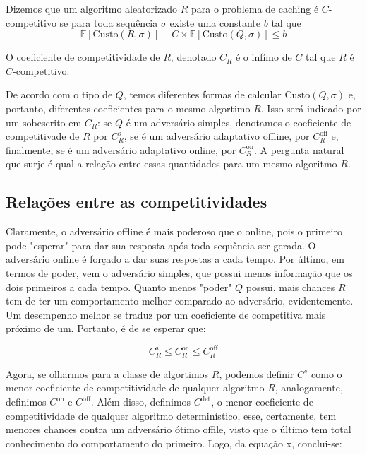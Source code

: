 \begin{definition}
  Dizemos que um algoritmo aleatorizado \(R\) para o problema de caching é \(C\)-competitivo se para toda sequência \(\sigma\) existe uma constante \(b\) tal que
  \begin{equation}
    \mathbb{E}[\text{Custo}(R, \sigma)] - C \times \mathbb{E}[\text{Custo}(Q, \sigma)] \leqslant b
  \end{equation}
  
\end{definition}

O coeficiente de competitividade de \(R\), denotado \(C_R\) é o infímo de \(C\) tal que \(R\) é \(C\)-competitivo.

De acordo com o tipo de \(Q\), temos diferentes formas de calcular \(\text{Custo}(Q, \sigma)\) e, portanto, diferentes coeficientes para o mesmo algortimo \(R\). Isso será indicado por um sobescrito em \(C_R\): se \(Q\) é um adversário simples, denotamos o coeficiente de competitivade de \(R\) por \(C_R^{\text{s}}\), se é um adversário adaptativo offline, por \(C_R^{\text{off}}\) e, finalmente, se é um adversário adaptativo online, por \(C_R^{\text{on}}\). A pergunta natural que surje é qual a relação entre essas quantidades para um mesmo algoritmo \(R\).

\subsection{Relações entre as competitividades}

Claramente, o adversário offline é mais poderoso que o online, pois o primeiro pode "esperar" para dar sua resposta após toda sequência ser gerada. O adversário online é forçado a dar suas respostas a cada tempo. Por último, em termos de poder, vem o adversário simples, que possui menos informação que os dois primeiros a cada tempo. Quanto menos "poder" \(Q\) possui, mais chances \(R\) tem de ter um comportamento melhor comparado ao adversário, evidentemente. Um desempenho melhor se traduz por um coeficiente de competitiva mais próximo de um. Portanto, é de se esperar que:

\begin{equation}
  C_R^{\text{s}} \leqslant C_R^{\text{on}} \leqslant C_R^{\text{off}}
\end{equation}

Agora, se olharmos para a classe de algortimos \(R\), podemos definir \(C^{s}\) como o menor coeficiente de competitividade de qualquer algoritmo \(R\), analogamente, definimos \(C^\text{{on}}\) e \(C^\text{{off}}\). Além disso, definimos \(C^{\text{det}}\), o menor coeficiente de competitividade de qualquer algoritmo determinístico, esse, certamente, tem menores chances contra um adversário ótimo offile, visto que o último tem total conhecimento do comportamento do primeiro. Logo, da equação x, conclui-se:

